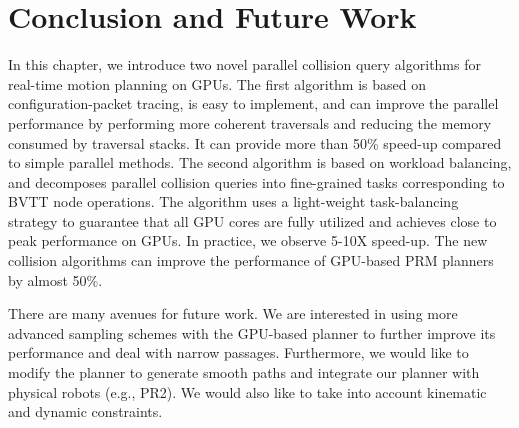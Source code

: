 \section{Conclusion and Future Work}
In this chapter, we introduce two novel parallel collision query algorithms for real-time motion planning on GPUs.
The first algorithm is based on configuration-packet tracing, is easy to implement, and can improve the parallel
performance by performing more coherent traversals and reducing the memory consumed by traversal stacks. It can provide
more than 50\% speed-up compared to simple parallel methods. The second algorithm is based on workload balancing, and
decomposes parallel collision queries into fine-grained tasks corresponding to  BVTT node operations. The algorithm
uses a light-weight task-balancing strategy to guarantee that all GPU cores are fully utilized and achieves
close to peak performance on GPUs. In practice, we observe 5-10X speed-up. The new collision algorithms can improve
the performance of GPU-based PRM planners by almost 50\%.

There are many avenues for future work. We are interested in using more advanced sampling schemes with the
GPU-based planner to further improve its performance and deal with narrow passages. Furthermore, we would like to
modify the planner to generate smooth paths and integrate our planner with physical robots (e.g., PR2).
We would also like to take into account kinematic and dynamic constraints.
